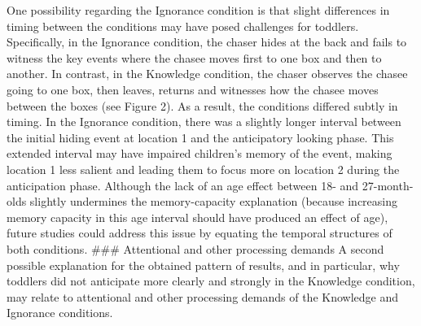 \documentclass[
  man,floatsintext]{apa6}
\begin{document}
One possibility regarding the Ignorance condition is that slight differences in timing between the conditions may have posed challenges for toddlers. Specifically, in the Ignorance condition, the chaser hides at the back and fails to witness the key events where the chasee moves first to one box and then to another. In contrast, in the Knowledge condition, the chaser observes the chasee going to one box, then leaves, returns and witnesses how the chasee moves between the boxes (see Figure 2). As a result, the conditions differed subtly in timing. In the Ignorance condition, there was a slightly longer interval between the initial hiding event at location 1 and the anticipatory looking phase. This extended interval may have impaired children's memory of the event, making location 1 less salient and leading them to focus more on location 2 during the anticipation phase. Although the lack of an age effect between 18- and 27-month-olds slightly undermines the memory-capacity explanation (because increasing memory capacity in this age interval should have produced an effect of age), future studies could address this issue by equating the temporal structures of both conditions.
\#\#\# Attentional and other processing demands
A second possible explanation for the obtained pattern of results, and in particular, why toddlers did not anticipate more clearly and strongly in the Knowledge condition, may relate to attentional and other processing demands of the Knowledge and Ignorance conditions.
\end{document}
